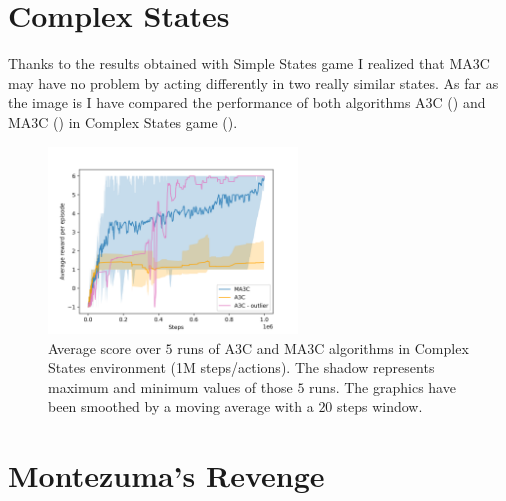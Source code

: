 \section{Complex States}

Thanks to the results obtained with Simple States game I realized that \ac{MA3C} may have no problem by acting differently
in two really similar states.
As far as the image is
I have compared the performance of both algorithms \ac{A3C} () and \ac{MA3C} () in Complex
States game ().

\begin{figure}[hbtp]
\begin{center}
\includegraphics[width=250]{img/ComplexStates_performance.png}
\end{center}
\caption[Complex States performance]
{Average score over $5$ runs of \ac{A3C} and \ac{MA3C} algorithms in Complex States environment (1M steps/actions).
The shadow represents maximum and minimum values of those $5$ runs.
The graphics have been smoothed by a moving average with a $20$ steps window.}%
\label{fig:ComplexStates_performance}
\end{figure}

\section{Montezuma's Revenge}
